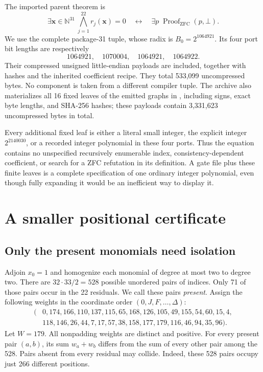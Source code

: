 \documentclass[11pt]{article}
\newcommand{\N}{\mathbb N}
\newcommand{\file}[1]{\texttt{\small\detokenize{#1}}}
\theoremstyle{definition}\newtheorem{definition}[theorem]{Definition}
\theoremstyle{remark}\newtheorem{remark}[theorem]{Remark}
\begin{document}
The imported parent theorem is
\begin{equation}\label{eq:parent}
 \exists\mathbf x\in\N^{31}\ \bigwedge_{j=1}^{22}r_j(\mathbf x)=0
 \quad\longleftrightarrow\quad
 \exists p\;\operatorname{Proof}_{\mathrm{ZFC}}(p,\bot).
\end{equation}
We use the complete package-31 tuple, whose radix is $B_0=2^{1064921}$.
Its four port bit lengths are respectively
\[
1064921,\quad1070004,\quad1064921,\quad1064922.
\]
Their compressed unsigned little-endian payloads are included, together
with hashes and the inherited coefficient recipe. They total 533,099
uncompressed bytes. No component is taken from a different compiler tuple.
The archive also materializes all 16 fixed leaves of the emitted graphs
in \file{data/fixed/}, including signs, exact byte lengths, and SHA-256
hashes; these payloads contain 3,331,623 uncompressed bytes in total.

Every additional fixed leaf is either a literal small integer, the explicit
integer $2^{2140030}$, or a recorded integer polynomial in these four ports.
Thus the equation contains no unspecified recursively enumerable index,
consistency-dependent coefficient, or search for a ZFC refutation in its
definition. A gate file plus these finite leaves is a complete specification
of one ordinary integer polynomial, even though fully expanding it would be
an inefficient way to display it.

\section{A smaller positional certificate}
\label{sec:packing}
\subsection{Only the present monomials need isolation}
Adjoin $x_0=1$ and homogenize each monomial of degree at most two to
degree two. There are $32\cdot33/2=528$ possible unordered pairs of indices.
Only 71 of those pairs occur in the 22 residuals. We call these pairs
\emph{present}. Assign the following weights in the coordinate order
$(0,J,F,\ldots,\Delta)$:
\begin{equation}\label{eq:weights}
\begin{split}
(&0,174,166,110,137,115,65,168,126,105,49,155,54,60,15,4,\\
 &118,146,26,44,7,17,57,38,158,177,179,116,46,94,35,96).
\end{split}
\end{equation}
Let $W=179$. All nonpadding weights are distinct and positive.
For every present pair $(a,b)$, its sum $w_a+w_b$ differs from the sum
of every other pair among the 528. Pairs absent from every residual may
collide. Indeed, these 528 pairs occupy just 266 different positions.
\end{document}
